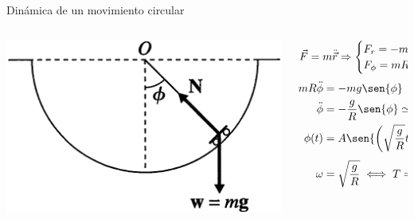 \documentclass[serif]{beamer}
\begin{document}
\begin{frame}
\begin{block}{Dinámica de un movimiento circular}
\begin{columns}[c]
	\begin{column}{0.35\textwidth}
		\includegraphics[width=\textwidth]{taylor1_14}
	\end{column}
  \begin{column}{0.65\textwidth}
		\[
			\vec{F}= m \ddot{\vec{r}} \Rightarrow
			\begin{cases}
				F_r = -m R \dot{\phi}^2= m g \cos{\phi} - N \\
				F_\phi = m R \ddot{\phi}= -m g \sen{\phi}
			\end{cases}
		\]
		\begin{align*}
			m R \ddot{\phi} & = -m g \sen{\phi} \\
			\ddot{\phi} & = - \frac{g}{R} \sen{\phi} \simeq - \frac{g}{R} \phi\, (\phi \simeq 0)\\
			\phi(t) & = A \sen{\left( \sqrt{\frac{g}{R}} t \right) }+ B \cos(\sqrt{\frac{g}{R}} t) \\
			\omega & =  \sqrt{\frac{g}{R}} \iff T = \frac{2\pi}{\omega}= 2\pi \sqrt{\frac{R}{g}}  
		\end{align*}
	\end{column}
\end{columns}
\end{block}
\end{frame}
\end{document}
